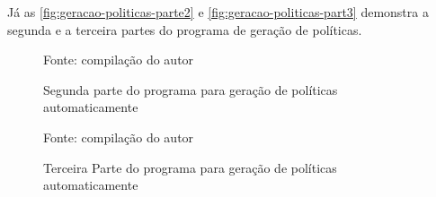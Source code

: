 Já as \autoref{fig:geracao-politicas-parte2} e \autoref{fig:geracao-politicas-part3} demonstra a segunda e a terceira partes do programa de geração de políticas.
\begin{figure}[h!]
	\centering
	\caption{Segunda parte do programa para geração de políticas automaticamente}
	
	\label{fig:geracao-politicas-parte2}
	{\scriptsize Fonte: compilação do autor}
\end{figure}

\begin{figure}[h!]
	\centering
	\caption{Terceira Parte do programa para geração de políticas automaticamente}
	
	\label{fig:geracao-politicas-part3}
	{\scriptsize Fonte: compilação do autor}
\end{figure} 

